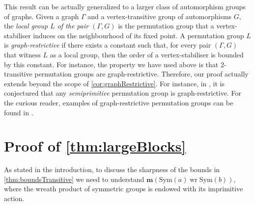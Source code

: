 \documentclass[a4paper]{amsart}
\newcommand{\Sym}{\mathrm{Sym}}
\renewcommand{\wr}{\mathop{\mathrm{wr}}}
\newcommand{\m}{\mathbf{m}}
\theoremstyle{definition}
\begin{document}
This result can be actually generalized to a larger class of automorphism groups of graphs. Given a graph $\Gamma$ and a vertex-transitive group of automorphisms $G$, the \emph{local group $L$ of the pair $(\Gamma,G)$} is the permutation group that a vertex-stabiliser induces on the neighbourhood of its fixed point. A permutation group $L$ is \emph{graph-restrictive} if there exists a constant such that, for every pair $(\Gamma,G)$ that witness $L$ as a local group, then the order of a vertex-stabiliser is bounded by this constant. For instance, the property we have used above is that $2$-transitive permutation groups are graph-restrictive. Therefore, our proof actually extends beyond the scope of \cref{cor:graphRestrictive}. For instance, in \cite{PotocnikSpigaVerret2012}, it is conjectured that any \emph{semiprimitive} permutation group is graph-restrictive. For the curious reader, examples of graph-restrictive permutation groups can be found in \cite{GiudiciMorgan2014,GiudiciMorgan2015,Morgan2023,MorganSpigaVerret2015,Spiga2016,Trofimov2022}.



\section{Proof of \cref{thm:largeBlocks}} \label{sec:ingredient}
As stated in the introduction, to discuss the sharpness of the bounds in \cref{thm:boundsTransitive} we need to understand $\m(\Sym(a) \wr \Sym(b))$, where the wreath product of symmetric groups is endowed with its imprimitive action.
\end{document}
